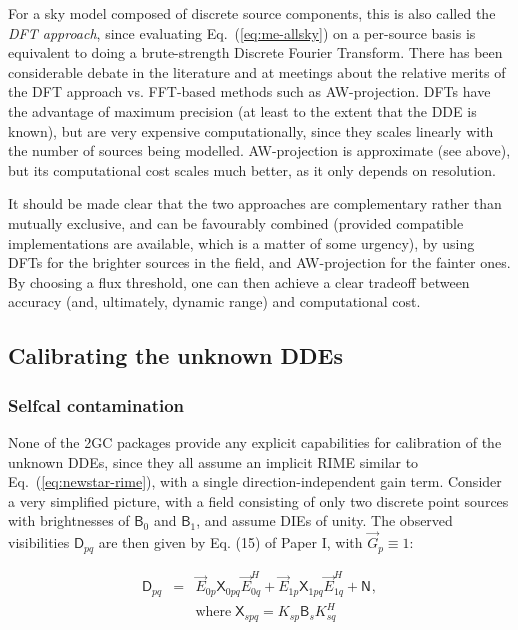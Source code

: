 \documentclass[referee]{aa}
\newcommand{\herm}{H}
\newcommand{\jones}[2]{\vec {#1}_{#2}}
\newcommand{\jonesT}[2]{\vec {#1}^{\herm}_{#2}}
\newcommand{\coh}[2]{\mathsf{{#1}}_{{#2}}}
\begin{document}
For a sky model composed of discrete source components, this is also called the \emph{DFT approach}, since evaluating Eq.~(\ref{eq:me-allsky}) on a per-source basis is equivalent to doing a brute-strength Discrete Fourier Transform. There has been considerable debate in the literature and at meetings about the relative merits of the DFT approach vs. FFT-based methods such as AW-projection. DFTs have the advantage of maximum precision (at least to the extent that the DDE is known), but are very expensive computationally, since they scales linearly with the number of sources being modelled. AW-projection is approximate (see above), but its computational cost scales much better, as it only depends on resolution.

It should be made clear that the two approaches are complementary rather than mutually exclusive, and can be favourably combined (provided compatible implementations are available, which is a matter of some urgency), by using DFTs for the brighter sources in the field, and AW-projection for the fainter ones. By choosing a flux threshold, one can then achieve a clear tradeoff between accuracy (and, ultimately, dynamic range) and computational cost. 

\subsection{Calibrating the unknown DDEs}

\subsubsection{Selfcal contamination}

None of the 2GC packages provide any explicit capabilities for calibration of the unknown DDEs, since they all assume an implicit RIME similar to Eq.~(\ref{eq:newstar-rime}), with a single direction-independent gain term. Consider a very simplified picture, with a field consisting of only two discrete point sources with brightnesses of $\coh{B}{0}$ and $\coh{B}{1}$, and assume DIEs of unity. The observed visibilities $\coh{D}{pq}$ are then given by Eq. (15) of Paper I, with $\jones{G}{p}\equiv1$:

\begin{eqnarray}\label{eq:selfcal-dpq}
\coh{D}{pq} & = & \jones{E}{0p} \coh{X}{0pq} \jonesT{E}{0q} + \jones{E}{1p} \coh{X}{1pq} \jonesT{E}{1q} + \coh{N}{}, \\
\nonumber && \mathrm{where}\; \coh{X}{spq} = K_{sp} \coh{B}{s} K^\herm_{sq}
\end{eqnarray}  
\end{document}
